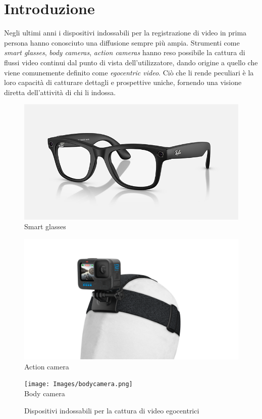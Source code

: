 \chapter{Introduzione}

Negli ultimi anni i dispositivi indossabili per la registrazione di video in prima persona hanno conosciuto una diffusione sempre più ampia. Strumenti come \emph{smart glasses}, \emph{body cameras}, \emph{action cameras} hanno reso possibile la cattura di flussi video continui dal punto di vista dell'utilizzatore, dando origine a quello che viene comunemente definito come \emph{egocentric video}. Ciò che li rende peculiari è la loro capacità di catturare dettagli e prospettive uniche, fornendo una visione diretta dell'attività di chi li indossa.

\begin{figure}[ht]
    \centering
    \begin{minipage}{0.3\linewidth}
        \centering
        \includegraphics[width=\linewidth]{Images/meta_glass.png}\\
        Smart glasses
    \end{minipage}
    \hfill
    \begin{minipage}{0.3\linewidth}
        \centering
        \includegraphics[width=\linewidth]{Images/gopro.png}\\
        Action camera
    \end{minipage}
    \hfill
    \begin{minipage}{0.3\linewidth}
        \centering
        \texttt{[image: Images/bodycamera.png]}\\
        Body camera
    \end{minipage}
    \caption{Dispositivi indossabili per la cattura di video egocentrici}
    \label{fig:dispositivi_egocentrici}
\end{figure}

